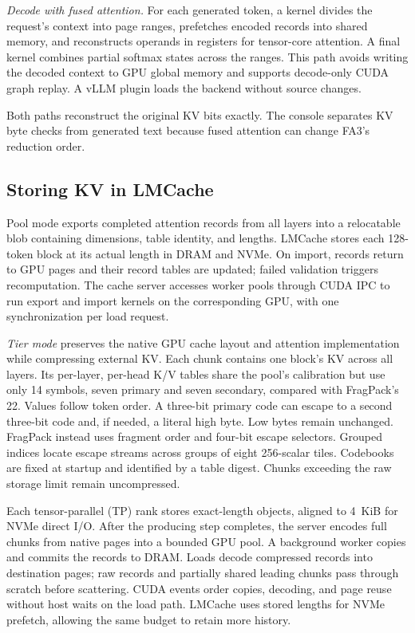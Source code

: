 \documentclass[conference]{IEEEtran}
\begin{document}
\emph{Decode with fused attention.} For each generated token, a kernel divides
the request's context into page ranges, prefetches encoded records into
shared memory, and reconstructs operands in registers for tensor-core
attention. A final kernel combines partial softmax states across the
ranges. This path avoids writing the decoded context to GPU global memory
and supports decode-only CUDA graph replay. A vLLM plugin loads the backend
without source changes.

Both paths reconstruct the original KV bits exactly. The console separates
KV byte checks from generated text because fused attention can change
FA3's reduction order.

\subsection{Storing KV in LMCache}
Pool mode exports completed attention records from all layers into a
relocatable blob containing dimensions, table identity, and lengths.
LMCache stores each 128-token block at its actual length in DRAM and NVMe.
On import, records return to GPU pages and their record tables are updated;
failed validation triggers recomputation. The cache server accesses worker
pools through CUDA IPC to run export and import kernels on the corresponding
GPU, with one synchronization per load request.

\emph{Tier mode} preserves the native GPU cache layout and attention
implementation while compressing external KV. Each chunk contains one
block's KV across all layers. Its per-layer, per-head K/V tables share the
pool's calibration but use only 14 symbols, seven primary and seven
secondary, compared with FragPack's 22. Values follow token order. A
three-bit primary code can escape to a second three-bit code and, if
needed, a literal high byte.
Low bytes remain unchanged. FragPack instead uses fragment order and
four-bit escape selectors.
Grouped indices locate escape streams across groups of eight 256-scalar
tiles. Codebooks are fixed
at startup and identified by a table digest. Chunks exceeding the raw
storage limit remain uncompressed.

Each tensor-parallel (TP) rank stores exact-length objects, aligned to
4~KiB for NVMe direct I/O. After the producing step completes, the server
encodes full chunks from native pages into a bounded GPU pool. A background
worker copies and commits the records to DRAM. Loads decode compressed
records into destination pages; raw records and partially shared leading
chunks pass through scratch before scattering. CUDA events order copies,
decoding, and page reuse without host waits on the load path. LMCache uses
stored lengths for NVMe prefetch, allowing the same budget to retain more
history.
\end{document}
